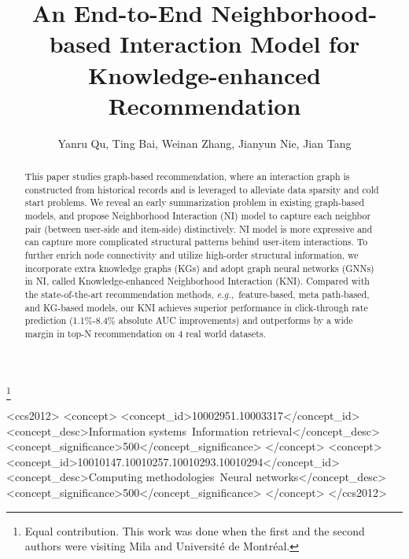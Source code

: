 \documentclass[sigconf]{acmart}
\newcommand{\new}[1]{{\color{black} #1}}
\newcommand{\eg}{\emph{e.g.},~}
\begin{document}
\title[]{An End-to-End Neighborhood-based Interaction Model for Knowledge-enhanced Recommendation}

\author{Yanru Qu, Ting Bai, Weinan Zhang, Jianyun Nie, Jian Tang} \thanks{ Equal contribution. This work was done when the first and the second authors were visiting Mila and Universit\'e de Montr\'eal.}

\renewcommand{\shortauthors}{}

\begin{abstract}
\new{This paper studies graph-based recommendation, where an interaction graph is constructed from historical records and is leveraged to alleviate data sparsity and cold start problems. We reveal an early summarization problem in existing graph-based models, and propose Neighborhood Interaction (NI) model to capture each neighbor pair (between user-side and item-side) distinctively. NI model is more expressive and can capture more complicated structural patterns behind user-item interactions. To further enrich node connectivity and utilize high-order structural information, we incorporate extra knowledge graphs (KGs) and adopt graph neural networks (GNNs) in NI, called Knowledge-enhanced Neighborhood Interaction (KNI).
Compared with the state-of-the-art recommendation methods, \eg feature-based, meta path-based, and KG-based models, our KNI achieves superior performance in click-through rate prediction (1.1\%-8.4\% absolute AUC improvements) and outperforms by a wide margin in top-N recommendation on 4 real world datasets. 
}
\end{abstract}



\acmPrice{}

\begin{CCSXML}
<ccs2012>
<concept>
<concept_id>10002951.10003317</concept_id>
<concept_desc>Information systems~Information retrieval</concept_desc>
<concept_significance>500</concept_significance>
</concept>
<concept>
<concept_id>10010147.10010257.10010293.10010294</concept_id>
<concept_desc>Computing methodologies~Neural networks</concept_desc>
<concept_significance>500</concept_significance>
</concept>
</ccs2012>
\end{CCSXML}
\end{document}
